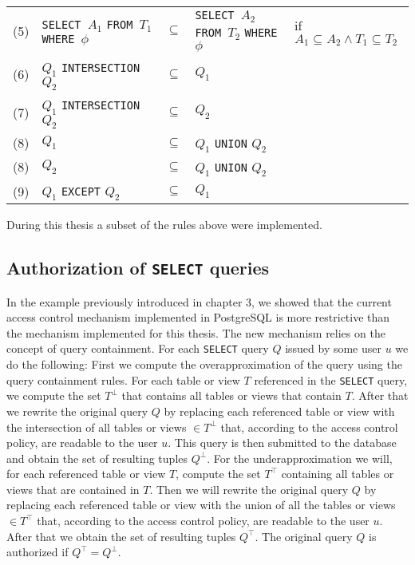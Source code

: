 {\begin{center}
\begin{longtable}{ p{5mm} p{40mm} p{5mm} p{25mm} p{25mm} }
	(5) \label{proj2} &
	\texttt{SELECT $A_1$} \newline
	\texttt{FROM $T_1$} \newline
	\texttt{WHERE $\phi$} &
	$\subseteq$ &
	\texttt{SELECT $A_2$} \newline
	\texttt{FROM $T_2$} \newline
	\texttt{WHERE $\phi$}&
	if $A_1 \subseteq A_2 \land T_1 \subseteq T_2$
	\\
	
	(6) \label{intersect1} &
	$Q_1$ \texttt{INTERSECTION} $Q_2$ &
	$\subseteq$ &
	$Q_1$&
	\\
	
	(7) \label{intersect2} &
	$Q_1$ \texttt{INTERSECTION} $Q_2$ &
	$\subseteq$ &
	$Q_2$&
	\\
	
	(8) \label{union1} &
	$Q_1$&
	$\subseteq$ &
	$Q_1$ \texttt{UNION} $Q_2$ &
	\\
	
	(8) \label{union2} &
	$Q_2$&
	$\subseteq$ &
	$Q_1$ \texttt{UNION} $Q_2$ &
	\\
	
	(9) \label{except} &
	$Q_1$ \texttt{EXCEPT} $Q_2$ &
	$\subseteq$ &
	$Q_1$&
	\\
	\end{longtable}
\end{center}

During this thesis a subset of the rules above were implemented.

\subsection{Authorization of \texttt{SELECT} queries}

In the example previously introduced in chapter 3, we showed that the current access control mechanism implemented in PostgreSQL is more restrictive than the mechanism implemented for this thesis.
%
The new mechanism relies on the concept of query containment.
%
For each \texttt{SELECT} query $Q$ issued by some user $u$ we do the following:
%
First we compute the overapproximation of the query using the query containment rules.
%
For each table or view $T$ referenced in the \texttt{SELECT} query, we compute the set $T^\bot$ that contains all tables or views that contain $T$.
%
After that we rewrite the original query $Q$ by replacing each referenced table or view with the intersection of all tables or views $\in T^\bot$ that, according to the access control policy, are readable to the user $u$.
%
This query is then submitted to the database and obtain the set of resulting tuples $Q^\bot$.
%
For the underapproximation we will, for each referenced table or view $T$, compute the set $T^\top$ containing all tables or views that are contained in $T$.
%
Then we will rewrite the original query $Q$ by replacing each referenced table or view with the union of all the tables or views $\in T^\top$ that, according to the access control policy, are readable to the user $u$.
%
After that we obtain the set of resulting tuples $Q^\top$.
%
The original query $Q$ is authorized if $Q^\top = Q^\bot$.

}
